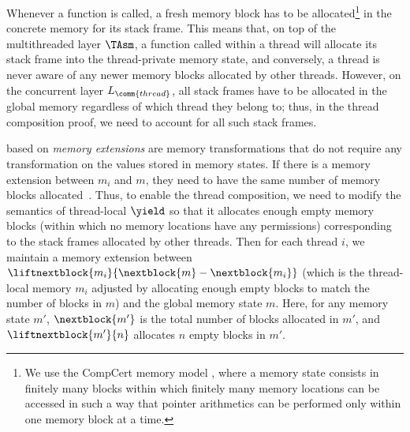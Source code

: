  Whenever
a function is called, a fresh memory block has to be allocated\footnote{We use the CompCert memory model \cite{leroy08}, where a memory state consists in finitely many blocks within which finitely many memory locations can be accessed in such a way that pointer arithmetics can be performed only within one memory block at a time.} in the
concrete memory for its stack frame. This means that, on top of the multithreaded layer $\TAsm$, a function called within a thread will allocate its stack frame
into the thread-private memory state, and conversely, a thread is
never aware of any newer memory blocks allocated by other
threads. However, on the concurrent layer $L_\comm{thread}$, all stack frames have to be allocated
in the global memory regardless of which thread they belong to;
thus, in the thread composition proof, we need to account
for all such stack frames.

 based on \emph{memory
  extensions} \cite[\S 5.2]{leroy08} are memory transformations that do
not require any transformation on the values
stored in memory states. If there is a memory
extension between $m_i$ and $m$, they need to have the same number of
memory blocks allocated~\cite{compcert-mem-v2}.
Thus, to enable the  thread composition, we need to modify the semantics of thread-local $\yield$ so
that it allocates enough empty memory blocks (within which no memory
locations have any permissions) corresponding to the stack frames
allocated by other threads. Then for each thread $i$, we
maintain a memory extension between $\liftnextblock{m_i}{\nextblock{m} -
\nextblock{m_i}}$ (which is the thread-local memory $m_i$ adjusted by
allocating enough empty blocks to match the number of blocks in $m$)
and the global memory state $m$.
Here, for any memory state $m'$, $\nextblock{m'}$ is the total number
of blocks allocated in $m'$, and $\liftnextblock{m'}{n}$ allocates $n$
empty blocks in $m'$.


